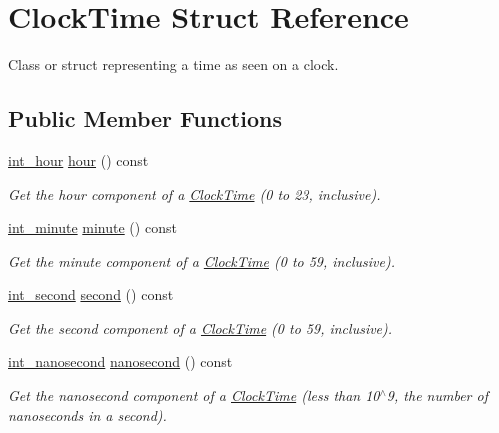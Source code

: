 \hypertarget{structClockTime}{\section{Clock\-Time Struct Reference}
\label{structClockTime}
}


Class or struct representing a time as seen on a clock.  


\subsection*{Public Member Functions}
\begin{DoxyCompactItemize}
\item 
\hyperlink{types_8h_abc83767329d565949a30f9990b5b2323}{int\-\_\-hour} \hyperlink{structClockTime_a46aca2fc3ed57f80398729383d7b81d3}{hour} () const 
\begin{DoxyCompactList}\small\item\em Get the hour component of a \hyperlink{structClockTime}{Clock\-Time} (0 to 23, inclusive). \end{DoxyCompactList}\item 
\hyperlink{types_8h_ac1c9417e7360815b48bbc1efa2b8240c}{int\-\_\-minute} \hyperlink{structClockTime_a812681b81ece92f27756f0618e56f37b}{minute} () const 
\begin{DoxyCompactList}\small\item\em Get the minute component of a \hyperlink{structClockTime}{Clock\-Time} (0 to 59, inclusive). \end{DoxyCompactList}\item 
\hyperlink{types_8h_a48e89dcdfecb9766dce0baf6254d089e}{int\-\_\-second} \hyperlink{structClockTime_a568f139cb2e19fca3e2ae2acdf47787f}{second} () const 
\begin{DoxyCompactList}\small\item\em Get the second component of a \hyperlink{structClockTime}{Clock\-Time} (0 to 59, inclusive). \end{DoxyCompactList}\item 
\hyperlink{types_8h_a6bb2edd220168240795ae6d50d7bf140}{int\-\_\-nanosecond} \hyperlink{structClockTime_abba9faf8356211d4dc830ca3b3d38f18}{nanosecond} () const 
\begin{DoxyCompactList}\small\item\em Get the nanosecond component of a \hyperlink{structClockTime}{Clock\-Time} (less than 10$^\wedge$9, the number of nanoseconds in a second). \end{DoxyCompactList}\item 

\end{DoxyCompactItemize}
